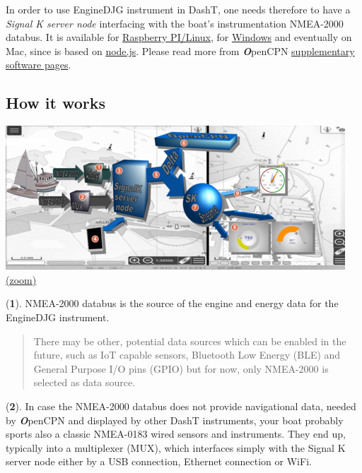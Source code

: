 \documentclass[11pt]{article}
\begin{document}
    In order to use EngineDJG instrument in DashT, one needs therefore to
have a \emph{Signal K server node} interfacing with the boat's
instrumentation NMEA-2000 databus. It is available for
\href{https://github.com/SignalK/signalk-server-node/blob/master/raspberry_pi_installation.md}{Raspberry
PI/Linux}, for
\href{https://opencpn.org/wiki/dokuwiki/doku.php?id=opencpn:supplementary_software:signalk:a3}{Windows}
and eventually on Mac, since is based on
\href{https://nodejs.org}{node.js}. Please read more from
\textbf{\emph{O}}penCPN
\href{https://opencpn.org/wiki/dokuwiki/doku.php?id=opencpn:supplementary_software:signalk}{supplementary
software pages}.

    \hypertarget{how-it-works}{%
\subsection{How it works}\label{how-it-works}}

    \includegraphics{2020-02-13_DashT_EngineDJG_SK_diagram_enumerated.png}
\href{img/2020-02-13_DashT_EngineDJG_SK_diagram_enumerated.png}{(zoom)}

    (\textbf{1}). NMEA-2000 databus is the source of the engine and energy
data for the EngineDJG instrument.

\begin{quote}
There may be other, potential data sources which can be enabled in the
future, such as IoT capable sensors, Bluetooth Low Energy (BLE) and
General Purpose I/O pins (GPIO) but for now, only NMEA-2000 is selected
as data source.
\end{quote}

    (\textbf{2}). In case the NMEA-2000 databus does not provide
navigational data, needed by \textbf{\emph{O}}penCPN and displayed by
other DashT instruments, your boat probably sports also a classic
NMEA-0183 wired sensors and instruments. They end up, typically into a
multiplexer (MUX), which interfaces simply with the Signal K server node
either by a USB connection, Ethernet connection or WiFi.
\end{document}
